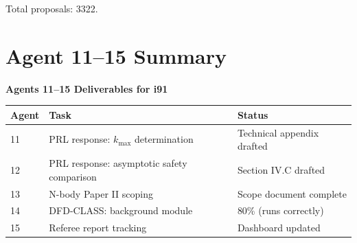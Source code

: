 \documentclass[11pt,a4paper]{article}
\begin{document}
Total proposals: 3322.

\section{Agent 11--15 Summary}

\begin{tcolorbox}[colback=green!5!white, colframe=dfdgreen]
\begin{center}
\textbf{Agents 11--15 Deliverables for i91}\\[6pt]
\begin{tabular}{lll}
\toprule
\textbf{Agent} & \textbf{Task} & \textbf{Status} \\
\midrule
11 & PRL response: $k_{\max}$ determination & Technical appendix drafted \\
12 & PRL response: asymptotic safety comparison & Section IV.C drafted \\
13 & N-body Paper II scoping & Scope document complete \\
14 & DFD-CLASS: background module & 80\% (runs correctly) \\
15 & Referee report tracking & Dashboard updated \\
\bottomrule
\end{tabular}
\end{center}
\end{tcolorbox}
\end{document}
